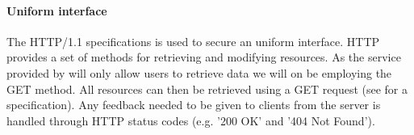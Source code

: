 \paragraph{Uniform interface} The HTTP/1.1 specifications is used to secure an uniform interface.
HTTP provides a set of methods for retrieving and modifying resources.
As the service provided by \projectname{} will only allow users to retrieve data we will on be employing the GET method.
All resources can then be retrieved using a GET request (see  for a specification).
Any feedback needed to be given to clients from the server is handled through HTTP status codes (e.g. '200 OK' and '404 Not Found').
